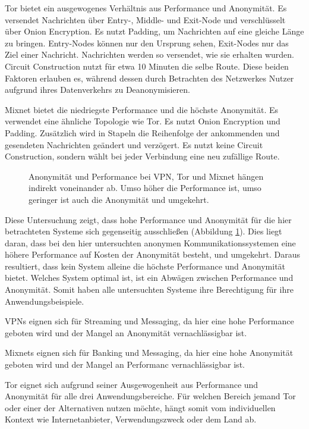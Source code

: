 Tor bietet ein ausgewogenes Verhältnis aus Performance und Anonymität. Es versendet Nachrichten über Entry-, Middle- und Exit-Node und verschlüsselt über Onion Encryption. Es nutzt Padding, um Nachrichten auf eine gleiche Länge zu bringen. Entry-Nodes können nur den Ursprung sehen, Exit-Nodes nur das Ziel einer Nachricht. Nachrichten werden so versendet, wie sie erhalten wurden. Circuit Construction nutzt für etwa 10 Minuten die selbe Route. Diese beiden Faktoren erlauben es, während dessen durch Betrachten des Netzwerkes Nutzer aufgrund ihres Datenverkehrs zu Deanonymisieren.

Mixnet bietet die niedriegste Performance und die höchste Anonymität. Es verwendet eine ähnliche Topologie wie Tor. Es nutzt Onion Encryption und Padding. Zusätzlich wird in Stapeln die Reihenfolge der ankommenden und gesendeten Nachrichten geändert und verzögert. Es nutzt keine Circuit Construction, sondern wählt bei jeder Verbindung eine neu zufällige Route.

\begin{figure}[h!]
    \centering
    
    \caption{Anonymität und Performance bei VPN, Tor und Mixnet hängen indirekt voneinander ab. Umso höher die Performance ist, umso geringer ist auch die Anonymität und umgekehrt.}
    \label{imgs:systems_discussion}
\end{figure}

Diese Untersuchung zeigt, dass hohe Performance und Anonymität für die hier betrachteten Systeme sich gegenseitig ausschließen (Abbildung \ref{imgs:systems_discussion}). Dies liegt daran, dass bei den hier untersuchten anonymen Kommunikationssystemen eine höhere Performance auf Kosten der Anonymität besteht, und umgekehrt. Daraus resultiert, dass kein System alleine die höchste Performance und Anonymität bietet. Welches System optimal ist, ist ein Abwägen zwischen Performance und Anonymität. Somit haben alle untersuchten Systeme ihre Berechtigung für ihre Anwendungsbeispiele.

VPNs eignen sich für Streaming und Messaging, da hier eine hohe Performance geboten wird und der Mangel an Anonymität vernachlässigbar ist.

Mixnets eignen sich für Banking und Messaging, da hier eine hohe Anonymität geboten wird und der Mangel an Performanc vernachlässigbar ist.

Tor eignet sich aufgrund seiner Ausgewogenheit aus Performance und Anonymität für alle drei Anwendungsbereiche. Für welchen Bereich jemand Tor oder einer der Alternativen nutzen möchte, hängt somit vom individuellen Kontext wie Internetanbieter, Verwendungszweck oder dem Land ab.

